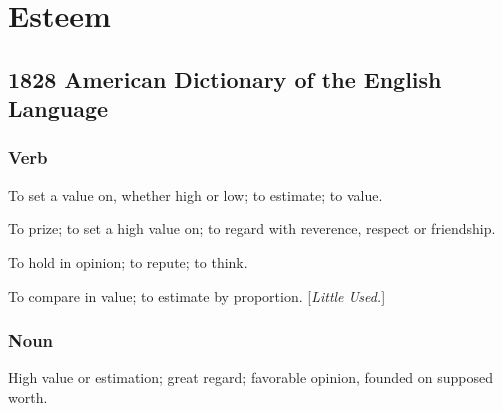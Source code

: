 \section{Esteem}
	\label{ESTEEM}
	

\subsection{1828 American Dictionary of the English Language} %
	\label{ESTEEM-1828}

	\subsubsection{Verb}

		\begin{compactitem}
			\item[1] To set a value on, whether high or low; to estimate; to value.
			\item[2] To prize; to set a high value on; to regard with reverence, respect or friendship.
			\item[3] To hold in opinion; to repute; to think.
			\item[4] To compare in value; to estimate by proportion. [\textit{Little Used.}]
		\end{compactitem}
		
	\subsubsection{Noun}
	
		\begin{compactitem}
			\item[1] High value or estimation; great regard; favorable opinion, founded on supposed worth.
		\end{compactitem}


